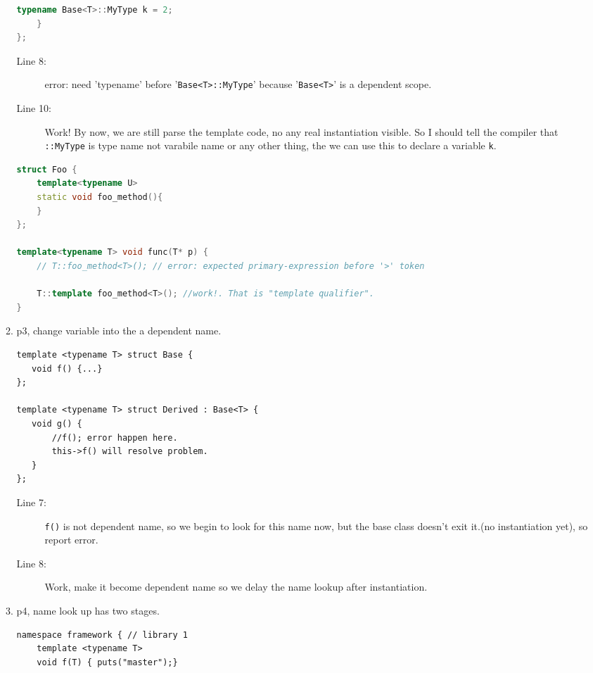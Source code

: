 \documentclass[a4paper,11pt,twoside]{book}
\begin{document}
\begin{itemize}
\begin{enumerate}
\begin{lstlisting}[frame=single, language=c++]
		typename Base<T>::MyType k = 2;
	}
};
\end{lstlisting}
\begin{description}
	
	\item[Line 8:] error: need 'typename' before '\texttt{Base<T>::MyType}' because '\texttt{Base<T>}' is a dependent scope.
	
	\item[Line 10:] Work! By now, we are still parse the template code, no any real instantiation visible. So I should tell the compiler that \texttt{::MyType} is type name not varabile name or any other thing, the we can use this to declare a variable \texttt{k}.
\end{description}

\begin{lstlisting}[frame=single, language=c++]
struct Foo {
	template<typename U>
	static void foo_method(){
	}
};

template<typename T> void func(T* p) {
	// T::foo_method<T>(); // error: expected primary-expression before '>' token
	
	T::template foo_method<T>(); //work!. That is "template qualifier".
}
\end{lstlisting}

\item p3, change variable into the a dependent name. 
\begin{lstlisting}[]
template <typename T> struct Base {
   void f() {...}
};

template <typename T> struct Derived : Base<T> {
   void g() {
       //f(); error happen here. 
       this->f() will resolve problem.
   }
};
\end{lstlisting}
\begin{description}
	\item[Line 7:] \texttt{f()} is not dependent name, so we begin to look for this name now, but the base class doesn't exit it.(no instantiation yet), so report error.
	
	\item[Line 8:] Work, make it become dependent name so we delay the name lookup after instantiation.
\end{description}


\item p4, name look up has two stages. 

\begin{lstlisting}[]
namespace framework { // library 1
	template <typename T>
	void f(T) { puts("master");}
 

\end{lstlisting}
\end{enumerate}
\end{itemize}
\end{document}
